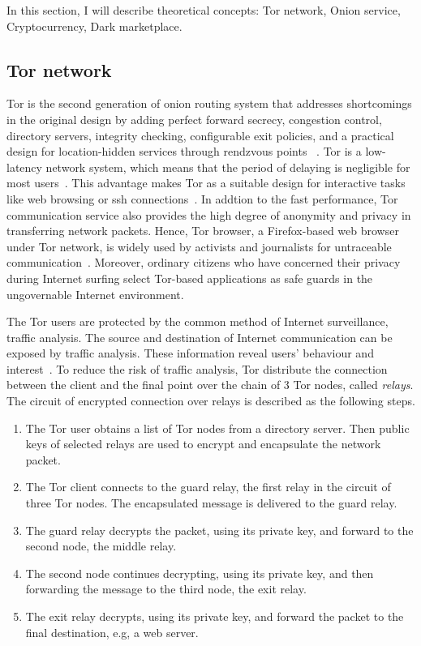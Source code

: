 In this section, I will describe theoretical concepts: Tor network, Onion service,
Cryptocurrency, Dark marketplace.

\subsection{Tor network}
Tor is the second generation of onion routing system that addresses shortcomings
in the original design by adding perfect forward secrecy, congestion control,
directory servers, integrity checking, configurable exit policies, and a
practical design for location-hidden services through rendzvous points
~\cite{paper:tor_design}. Tor is a low-latency network system, which means that
the period of delaying is negligible for most users~\cite{report:overview_tor}.
This advantage makes Tor as a
suitable design for interactive tasks like web browsing or \acrshort{ssh}
connections~\cite{dis:usage_of_onion_services}. In addtion to the fast performance,
Tor communication service also provides the high degree of anonymity and privacy
in transferring network packets. Hence, Tor browser, a Firefox-based web browser
under Tor network, is widely used by activists and journalists for untraceable
communication~\cite{dis:usage_of_onion_services}. Moreover, ordinary citizens who have concerned their privacy during
Internet surfing select Tor-based applications as safe guards in the ungovernable
Internet environment.

The Tor users are protected by the common method of Internet surveillance, traffic
analysis. The source and destination of Internet communication can be exposed by
traffic analysis. These information reveal users' behaviour and interest~\cite{web:onion_network}.
To reduce the risk of traffic analysis, Tor distribute the connection between the
client and the final point over the chain of 3 Tor nodes, called \emph{relays}.
The circuit of encrypted connection over relays is described as the following steps.
\begin{enumerate}
    \item The Tor user obtains a list of Tor nodes from a
    directory server. Then public keys of selected relays are used to encrypt and
    encapsulate the network packet.  
    \item The Tor client connects to the guard relay, the first relay in the circuit
    of three Tor nodes. The encapsulated message is delivered to the guard relay.
    \item The guard relay decrypts the packet, using its private key, 
    and forward to the second node, the middle relay.
    \item The second node continues decrypting, using its private key, and then
    forwarding the message to the third node, the exit relay.
    \item The exit relay decrypts, using its private key, and forward the packet
    to the final destination, e.g, a web server.
\end{enumerate}

